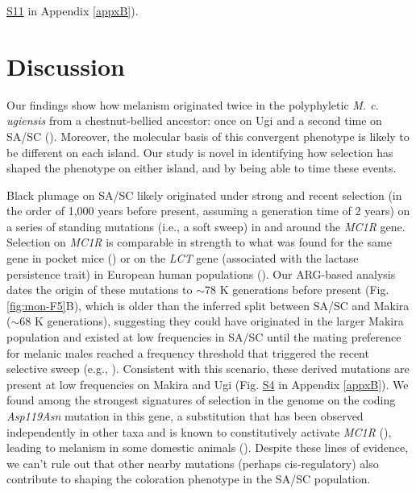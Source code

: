 \href{https://journals.plos.org/PLOSGENETICS/article?id=10.1371/journal.pgen.1010474#sec017}{S11} in Appendix \ref{appxB}).



\section{Discussion}
Our findings show how melanism originated twice in the polyphyletic \textit{M. c. ugiensis} from a chestnut-bellied ancestor: once on Ugi and a second time on \ac{SA/SC} (\cite{uy2016mutations,cooper2017genomic}). Moreover, the molecular basis of this convergent phenotype is likely to be different on each island. Our study is novel in identifying how selection has shaped the phenotype on either island, and by being able to time these events.

Black plumage on \ac{SA/SC} likely originated under strong and recent selection (in the order of 1,000 years before present, assuming a generation time of 2 years) on a series of standing mutations (i.e., a soft sweep) in and around the \textit{MC1R} gene. Selection on \textit{MC1R} is comparable in strength to what was found for the same gene in pocket mice (\cite{hoekstra2004ecological}) or on the \textit{LCT} gene (associated with the lactase persistence trait) in European human populations (\cite{hejase_deep-learning_2022,bersaglieri_genetic_2004}). Our \ac{ARG}-based analysis dates the origin of these mutations to $\sim$78 K generations before present (Fig. \ref{fig:mon-F5}B), which is older than the inferred split between \ac{SA/SC} and Makira ($\sim$68 K generations), suggesting they could have originated in the larger Makira population and existed at low frequencies in \ac{SA/SC} until the mating preference for melanic males reached a frequency threshold that triggered the recent selective sweep (e.g., \cite{kokko2002sexual}). Consistent with this scenario, these derived mutations are present at low frequencies on Makira and Ugi (Fig. \href{https://journals.plos.org/PLOSGENETICS/article?id=10.1371/journal.pgen.1010474#sec017}{S4} in Appendix \ref{appxB}). We found among the strongest signatures of selection in the genome on the coding \textit{Asp119Asn} mutation in this gene, a substitution that has been observed independently in other taxa and is known to constitutively activate \textit{MC1R} (\cite{lu1998ligand}), leading to melanism in some domestic animals (\cite{mundy2005window,kijas1998melanocortin,vaage1999molecular}). Despite these lines of evidence, we can’t rule out that other nearby mutations (perhaps cis-regulatory) also contribute to shaping the coloration phenotype in the \ac{SA/SC} population.

